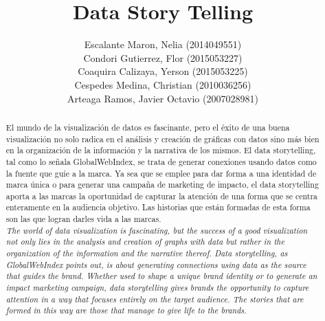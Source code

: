 \documentclass[preprint,12pt]{elsarticle}
\begin{document}
	\begin{frontmatter}
		
		
		\title{\huge Data Story Telling}
		
		
		\author{Escalante Maron, Nelia (2014049551)  
			\\Condori Gutierrez, Flor (2015053227)
			\\Coaquira Calizaya, Yerson (2015053225)
			\\Cespedes Medina, Christian (2010036256)   
			\\Arteaga Ramos, Javier Octavio (2007028981)  }
		
		\address{Tacna, Peru}
		
				
		\begin{abstract}
			
			El mundo de la visualización de datos es fascinante, pero el éxito de una buena visualización no solo radica en el análisis y creación de gráficas con datos sino más bien en la organización de la información y la narrativa de los mismos. 
			El data storytelling, tal como lo señala GlobalWebIndex, se trata de generar conexiones usando datos como la fuente que guíe a la marca. Ya sea que se emplee para dar forma a una identidad de marca única o para generar una campaña de marketing de impacto, el data storytelling aporta a las marcas la oportunidad de capturar la atención de una forma que se centra enteramente en la audiencia objetivo. Las historias que están formadas de esta forma son las que logran darles vida a las marcas.\\
			
			\textit{The world of data visualization is fascinating, but the success of a good visualization not only lies in the analysis and creation of graphs with data but rather in the organization of the information and the narrative thereof.
			Data storytelling, as GlobalWebIndex points out, is about generating connections using data as the source that guides the brand. Whether used to shape a unique brand identity or to generate an impact marketing campaign, data storytelling gives brands the opportunity to capture attention in a way that focuses entirely on the target audience. The stories that are formed in this way are those that manage to give life to the brands.}
						
		\end{abstract}
		
	\end{frontmatter}
	
\end{document}
